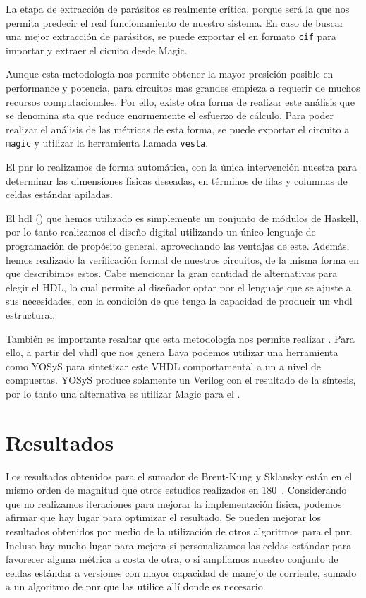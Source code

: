 La etapa de extracción de parásitos es realmente crítica, porque será la que nos permita predecir el real funcionamiento de nuestro sistema. En caso de buscar una mejor extracción de parásitos, se puede exportar el \layout en formato \verb.cif. para importar y extraer el cicuito desde Magic.

Aunque esta metodología nos permite obtener la mayor presición posible en performance y potencia, para circuitos mas grandes empieza a requerir de muchos recursos computacionales. Por ello, existe otra forma de realizar este análisis que se denomina \gls{sta} que reduce enormemente el esfuerzo de cálculo. Para poder realizar el análisis de las métricas de esta forma, se puede exportar el circuito a \verb.magic. y utilizar la herramienta llamada \verb.vesta.. 

El \gls{pnr} lo realizamos de forma automática, con la única intervención nuestra para determinar las dimensiones físicas deseadas, en términos de filas y columnas de celdas estándar apiladas.

El \gls{hdl} () que hemos utilizado es simplemente un conjunto de módulos de Haskell, por lo tanto realizamos el diseño digital utilizando un único lenguaje de programación de propósito general, aprovechando las ventajas de este. Además, hemos realizado la verificación formal de nuestros circuitos, de la misma forma en que describimos estos. Cabe mencionar la gran cantidad de alternativas para elegir el HDL, lo cual permite al diseñador optar por el lenguaje que se ajuste a sus necesidades, con la condición de que tenga la capacidad de producir un  \gls{vhdl} estructural.

También es importante resaltar que esta metodología nos permite realizar . Para ello, a partir del \gls{vhdl} que nos genera Lava podemos utilizar una herramienta como YOSyS\cite{Yosys} para sintetizar este VHDL comportamental a un  a nivel de compuertas. YOSyS produce solamente un  Verilog con el resultado de la síntesis, por lo tanto una alternativa es utilizar Magic para el \layout.

\section{Resultados}
Los resultados obtenidos para el sumador de Brent-Kung y Sklansky están en el mismo orden de magnitud que otros estudios\cite{ramanathan,Chatterjee} realizados en 180~\nanom. Considerando que no realizamos iteraciones para mejorar la implementación física, podemos afirmar que hay lugar para optimizar el resultado. Se pueden mejorar los resultados obtenidos por medio de la utilización de otros algoritmos para el \gls{pnr}. Incluso hay mucho lugar para mejora si personalizamos las celdas estándar para favorecer alguna métrica a costa de otra, o si ampliamos nuestro conjunto de celdas estándar a versiones con mayor capacidad de manejo de corriente, sumado a un algoritmo de \gls{pnr} que las utilice allí donde es necesario.

